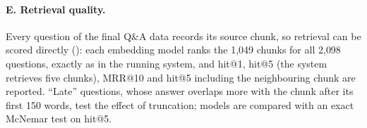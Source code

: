 \paragraph{E. Retrieval quality.} Every question of the final Q\&A data records its source chunk, so retrieval can be scored directly (): each embedding model ranks the 1{,}049 chunks for all 2{,}098 questions, exactly as in the running system, and hit@1, hit@5 (the system retrieves five chunks), MRR@10 and hit@5 including the neighbouring chunk are reported. ``Late'' questions, whose answer overlaps more with the chunk after its first 150 words, test the effect of truncation; models are compared with an exact McNemar test on hit@5.

\clearpage
